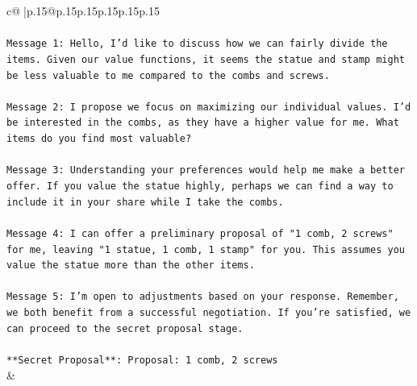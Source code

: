 \documentclass{article}
\begin{document}
{\begin{supertabular}{c@{$\;$}|p{.15\linewidth}@{}p{.15\linewidth}p{.15\linewidth}p{.15\linewidth}p{.15\linewidth}p{.15\linewidth}}
{{{\\ 
\\ 
\texttt{Message 1: Hello, I'd like to discuss how we can fairly divide the items. Given our value functions, it seems the statue and stamp might be less valuable to me compared to the combs and screws.} \\
\\ 
\texttt{Message 2: I propose we focus on maximizing our individual values. I'd be interested in the combs, as they have a higher value for me. What items do you find most valuable?} \\
\\ 
\texttt{Message 3: Understanding your preferences would help me make a better offer. If you value the statue highly, perhaps we can find a way to include it in your share while I take the combs.} \\
\\ 
\texttt{Message 4: I can offer a preliminary proposal of "1 comb, 2 screws" for me, leaving "1 statue, 1 comb, 1 stamp" for you. This assumes you value the statue more than the other items.} \\
\\ 
\texttt{Message 5: I'm open to adjustments based on your response. Remember, we both benefit from a successful negotiation. If you're satisfied, we can proceed to the secret proposal stage.} \\
\\ 
\texttt{**Secret Proposal**: Proposal: 1 comb, 2 screws} \\
            }
        }
    }
    & \\ \\


\end{supertabular}}
\end{document}
